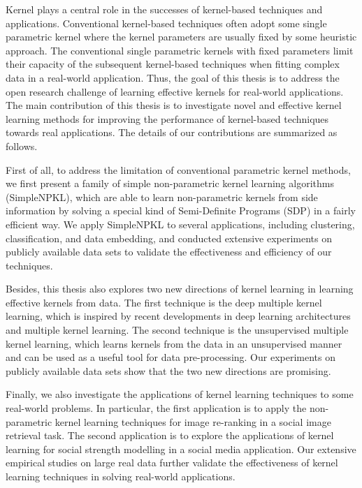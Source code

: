Kernel plays a central role in the successes of kernel-based techniques and applications. Conventional kernel-based techniques often adopt some single parametric kernel where the kernel parameters are usually fixed by some heuristic approach. The conventional single  parametric kernels with fixed parameters limit their capacity of the subsequent kernel-based techniques when fitting complex data in a real-world application. Thus, the goal of this thesis is to address the open research challenge of learning effective kernels for real-world applications. The main contribution of this thesis is to investigate novel and effective kernel learning methods for improving the performance of kernel-based techniques towards real applications. The details of our contributions are summarized as follows.
	
First of all, to address the limitation of conventional parametric kernel methods, we first present a family of simple non-parametric kernel learning algorithms (SimpleNPKL), which are able to learn non-parametric kernels from side information by solving a special kind of Semi-Definite Programs (SDP) in a fairly efficient way. We apply SimpleNPKL to several applications, including clustering, classification, and data embedding, and conducted extensive experiments on publicly available data sets to validate the effectiveness and efficiency of our techniques.

Besides, this thesis also explores two new directions of kernel learning in learning effective kernels from data. The first technique is the deep multiple kernel learning, which is inspired by recent developments in deep learning architectures and multiple kernel learning. The second technique is the unsupervised multiple kernel learning, which learns kernels from the data in an unsupervised manner and can be used as a useful tool for data pre-processing. Our  experiments on publicly available data sets show that the two new directions are promising.

Finally, we also investigate the applications of kernel learning techniques to some real-world problems. In particular, the first application is to apply the non-parametric kernel learning techniques for image re-ranking in a social image retrieval task. The second application is to explore the applications of kernel learning for social strength modelling in a social media application. Our extensive empirical studies on large real data further validate the effectiveness of kernel learning techniques in solving real-world applications.



